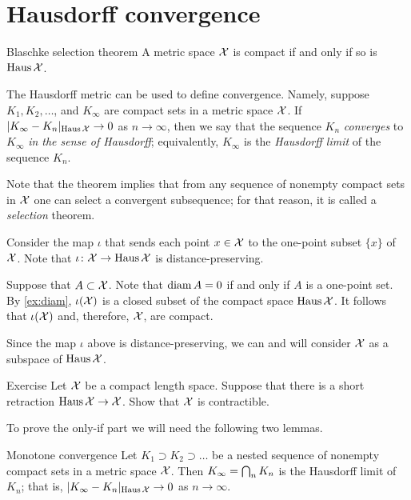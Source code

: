 \section{Hausdorff convergence}

\begin{thm}{Blaschke selection theorem}\label{thm:compact+Hausdorff}
A metric space $\mathcal{X}$ is compact if and only if
so is $\operatorname{\rm Haus}\nolimits\mathcal{X}$.
\end{thm}

The Hausdorff metric can be used to define convergence.
Namely, suppose $K_1,K_2,\dots$, and $K_\infty$ are compact sets in a metric space $\mathcal{X}$.
If $|K_\infty-K_n|_{\operatorname{\rm Haus}\nolimits\mathcal{X}}\to0$ as $n\to\infty$, then we say that 
the sequence $K_n$ {}\emph{converges} to $K_\infty$ \emph{in the sense of Hausdorff};
equivalently, $K_\infty$ is the \emph{Hausdorff limit} of the sequence $K_n$.

Note that the theorem implies that from any sequence of nonempty compact sets in $\mathcal{X}$ one can select a convergent subsequence; 
for that reason, it is called a \textit{selection} theorem. 

Consider the map $\iota$ that sends each point $x\in \mathcal{X}$ to the one-point subset $\{x\}$ of $\mathcal{X}$.
Note that $\iota\colon\mathcal{X}\to \operatorname{\rm Haus}\nolimits\mathcal{X}$ is distance-preserving.

Suppose that $A\subset \mathcal{X}$.
Note that $\operatorname{\rm diam}\nolimits A=0$ if and only if $A$ is a one-point set.
By \ref{ex:diam}, $\iota(\mathcal{X})$ is a closed subset of the compact space $\operatorname{\rm Haus}\nolimits\mathcal{X}$.
It follows that $\iota(\mathcal{X})$ and, therefore, $\mathcal{X}$, are compact.
\qeds

Since the map $\iota$ above is distance-preserving, we can and will consider $\mathcal{X}$ as a subspace of $\operatorname{\rm Haus}\nolimits\mathcal{X}$.

\begin{thm}{Exercise}\label{ex:haus-contractible}
Let $\mathcal{X}$ be a compact length space.
Suppose that there is a short retraction $\operatorname{\rm Haus}\nolimits\mathcal{X}\to \mathcal{X}$.
Show that $\mathcal{X}$ is contractible.
\end{thm}


To prove the only-if part we will need the following two lemmas.

\begin{thm}{Monotone convergence}\label{lem:decreasing-converges}
Let $K_1\supset K_2\supset\dots$ be a nested sequence of nonempty compact sets in a metric space $\mathcal{X}$.
Then $K_\infty\z=\bigcap_n K_n$ is the Hausdorff limit of $K_n$;
that is, $|K_\infty-K_n|_{\operatorname{\rm Haus}\nolimits\mathcal{X}}\to0$ as $n\to\infty$.
\end{thm}

